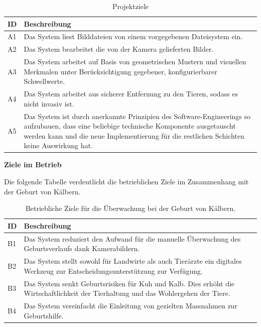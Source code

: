 \begin{table} [H]
	
	
	\begin{tabular}{ p{1cm} p{14cm} }
				
		\toprule[1pt]
		\rowcolor{maroon!30}	
		ID & Beschreibung \\
		
		\midrule 
		A1 & Das System liest Bilddateien von einem vorgegebenen Dateisystem ein.\\		
		A2 & Das System bearbeitet die von der Kamera gelieferten Bilder.\\				
		A3 & Das System arbeitet auf Basis von geometrischen Mustern und visuellen Merkmalen unter Berücksichtigung gegebener, konfigurierbarer Schwellwerte. \\		
		A4 & Das System arbeitet aus sicherer Entfernung zu den Tieren, sodass es nicht invasiv ist.\\				
		A5 & Das System ist durch anerkannte Prinzipien des Software-Engineerings so aufzubauen,
		dass eine beliebige technische Komponente ausgetauscht werden kann und die
		neue Implementierung für die restlichen Schichten keine Auswirkung hat.\\		
		
		\bottomrule
	\end{tabular}
	\caption{Projektziele}
	\label{tab: Projektziele}
\end{table}

\newpage

\textbf{Ziele im Betrieb}


Die folgende Tabelle verdeutlicht die betrieblichen Ziele im Zusammenhang mit der Geburt von Kälbern.

\begin{table}[H]
	
	\begin{tabular}{ p{1cm} p{14cm} }
		
		\toprule[1pt]
		\rowcolor{maroon!30}	
		ID & Beschreibung \\
		
		\midrule 
		B1 & Das System reduziert den Aufwand für die manuelle Überwachung des Geburtsverlaufs dank Kamerabildern. \\
		B2 & Das System stellt sowohl für Landwirte als auch Tierärzte ein digitales Werkzeug zur Entscheidungsunterstützung zur Verfügung.\\
		B3 & Das System senkt Geburtsrisiken für Kuh und Kalb. Dies erhöht die Wirtschaftlichkeit der Tierhaltung und das Wohlergehen der Tiere. \\
		B4 & Das System vereinfacht die Einleitung von gezielten Massnahmen zur Geburtshilfe.\\
		\bottomrule
		
	\end{tabular}
	\caption{Betriebliche Ziele für die Überwachung bei der Geburt von Kälbern.}
	\label{tab: Betriebliche Ziele für die Überwachung bei der Geburt von Kälbern.}
\end{table}

